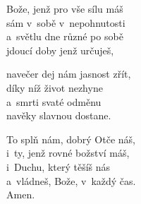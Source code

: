 \begin{translatioMulticol}{3}
Bože, jenž pro vše sílu máš\\
sám v~sobě v~nepohnutosti\\
a~světlu dne různé po sobě\\
jdoucí doby jenž určuješ,\columnbreak

navečer dej nám jasnost zřít,\\
díky níž život nezhyne\\
a~smrti svaté odměnu\\
navěky slavnou dostane.\columnbreak

To splň nám, dobrý Otče náš,\\
i~ty, jenž rovné božství máš,\\
i~Duchu, který těšíš nás\\
a~vládneš, Bože, v~každý čas.\\
Amen.
\end{translatioMulticol}
